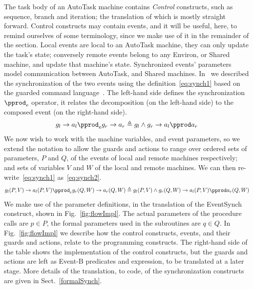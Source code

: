 The task body of an AutoTask machine contains \emph{Control} constructs, such as sequence, branch and iteration; the translation of which is mostly straight forward. Control constructs may contain events, and it will be useful, here, to remind ourselves of some terminology, since we make use of it in the remainder of the section. Local events are local to an AutoTask machine, they can only update the task's state; conversely remote events belong to any Environ, or Shared machine, and update that machine's state. Synchronized events' parameters model communication between AutoTask, and Shared machines. In~\cite{ae2011a} we described the synchronization of the two events using the definition~\ref{eq:synch1} based on the guarded command language~\cite{Dijkstra1975}. The left-hand side defines the synchronization $\pprod_e$ operator, it relates the decomposition (on the left-hand side) to the composed event (on the right-hand side).
%
\begin{equation}
g_l\rightarrow a_l \pprod_e g_r\rightarrow a_r \triangleq g_l \land g_r \rightarrow a_l \pprod a_r
\label{eq:synch1}
\end{equation}
%
We now wish to work with the machine variables, and event parameters, so we extend the notation to allow the guards and actions to range over ordered sets of parameters, $P$ and $Q$, of the events of local and remote machines respectively; and sets of variables $V$ and $W$ of the local and remote machines. We can then re-write~\eqref{eq:synch1} as~\eqref{eq:synch2}. 
%
\begin{equation}
g_l(P,V)\rightarrow a_l(P,V) \pprod_e g_r(Q,W)\rightarrow a_r(Q,W) \triangleq g_l(P,V) \land g_r(Q,W) \rightarrow a_l(P,V) \pprod a_r(Q,W)
\label{eq:synch2}
\end{equation}
%
We make use of the parameter definitions, in the translation of the EventSynch construct, shown in Fig.~\ref{fig:flowImpl}. The actual parameters of the procedure calls are $p\in P$, the formal parameters used in the subroutines are $q\in Q$.  In Fig.~\ref{fig:flowImpl} we describe how the control constructs, events, and their guards and actions, relate to the programming constructs. The right-hand side of the table shows the implementation of the control constructs, but the guards and actions are left as Event-B predicates and expression, to be translated at a later stage. More details of the translation, to code, of the synchronization constructs are given in Sect.~\ref{formalSynch}.

